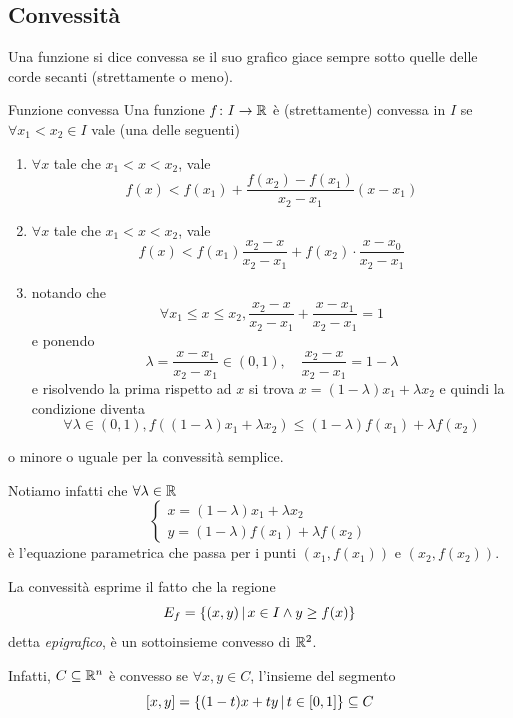 \documentclass[a4paper]{article}
\begin{document}
\pagebreak

\subsection{Convessità}

Una funzione si dice convessa se il suo grafico giace sempre sotto quelle delle corde secanti
(strettamente o meno).

\begin{snippetdefinition}{Funzione convessa}
    Una funzione \(f\colon I \to \mathbb{R}\) è (strettamente) convessa in \(I\)
    se \(\forall x_1 < x_2 \in I\) vale (una delle seguenti)
    \begin{enumerate}
        \item \(\forall x\) tale che \(x_1 < x < x_2\), vale \[
            f(x) < f(x_1) + \frac{f(x_2) - f(x_1)}{x_2 - x_1}(x-x_1)
        \]
        \item \(\forall x\) tale che \(x_1 < x < x_2\), vale \[
            f(x) < f(x_1) \frac{x_2 - x}{x_2 - x_1} + f(x_2) \cdot \frac{x-x_0}{x_2 - x_1}
        \]
        \item notando che \[
            \forall x_1 \leq x \leq x_2, \frac{x_2 - x}{x_2 - x_1} + \frac{x-x_1}{x_2 - x_1} = 1
        \]
        e ponendo
        \[
            \lambda = \frac{x-x_1}{x_2 - x_1} \in (0,1), \quad \frac{x_2-x}{x_2 - x_1} = 1 - \lambda
        \]
        e risolvendo la prima rispetto ad \(x\) si trova
        \(x = (1-\lambda)x_1 + \lambda x_2\) e quindi la condizione diventa
        \[
            \forall \lambda \in (0,1), f((1-\lambda) x_1 + \lambda x_2) \leq (1-\lambda)f(x_1) + \lambda f(x_2)
        \]
    \end{enumerate}
    o minore o uguale per la convessità semplice.
\end{snippetdefinition}

Notiamo infatti che \(\forall \lambda \in \mathbb{R}\)
\[
    \begin{cases}
        x = (1-\lambda)x_1 + \lambda x_2 \\
        y = (1-\lambda)f(x_1) + \lambda f(x_2)
    \end{cases}
\]
è l'equazione parametrica che passa per i punti \((x_1, f(x_1))\) e \((x_2, f(x_2))\).

La convessità esprime il fatto che la regione
\[
    E_f = \{(x,y) \,|\, x \in I \land y \geq f(x)\}
\]
detta \emph{epigrafico}, è un sottoinsieme convesso di \(\mathbb{R}^2\).

Infatti, \(C \subseteq \mathbb{R}^n\) è convesso se \(\forall x,y \in C\),
l'insieme del segmento
\[
    [x,y] = \{(1-t)x + ty \,|\, t \in [0,1]\} \subseteq C
\]
\end{document}
